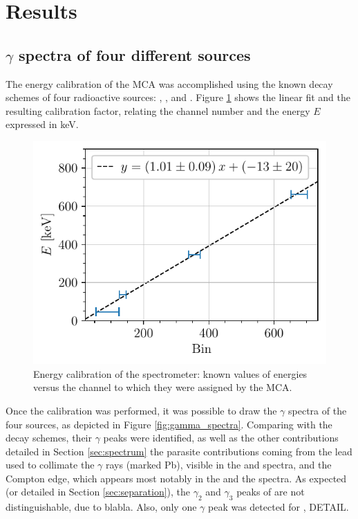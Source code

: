 \section{Results}
\subsection{$\gamma$ spectra of four different sources}
The energy calibration of the MCA was accomplished using the known decay 
schemes\cite{notice_generale} of four radioactive sources: 
\cesium, \cobalt, \lead and \hafnium \footnotemark.
Figure \ref{fig:calibration_energy} shows the linear fit 
and the resulting calibration factor, relating the channel number 
and the energy $E$ expressed in keV.
%
\begin{figure}[htbp]
    \centering
    \includegraphics[scale=1]{figures/calibration_energy.pdf}
    \caption{Energy calibration of the spectrometer: known values of energies 
    versus the channel to which they were assigned by the MCA.}
    \label{fig:calibration_energy}
\end{figure}

Once the calibration was performed, it was possible to draw the $\gamma$ spectra 
of the four sources, as depicted in Figure \ref{fig:gamma_spectra}.
Comparing with the decay schemes, their $\gamma$ peaks were identified,
as well as the other contributions detailed in Section \ref{sec:spectrum}
the parasite contributions coming from the lead used to collimate 
the $\gamma$ rays (marked Pb), visible in the \cesium and \hafnium spectra, 
and the Compton edge, which appears most notably in the \cesium 
and the \lead spectra.
As expected (or detailed in Section \ref{sec:separation}), the $\gamma_2$ and $\gamma_3$ peaks of \cobalt are not distinguishable, due to blabla.
Also, only one $\gamma$ peak was detected for \hafnium, DETAIL.

